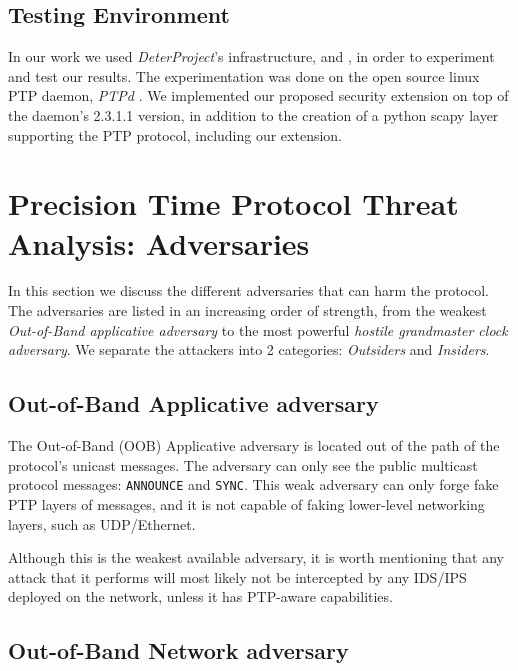 \documentclass[11pt]{article}
\begin{document}
\subsection{Testing Environment}\label{environment}

In our work we used \emph{DeterProject}'s infrastructure, \cite{Deter} and \cite{DeterProject}, in order to experiment and test our results. The experimentation was done on the open source linux PTP daemon, \emph{PTPd} \cite{PTPd}. We implemented our proposed security extension on top of the daemon's 2.3.1.1 version, in addition to the creation of a python scapy layer supporting the PTP protocol, including our extension.





\section{Precision Time Protocol Threat Analysis: Adversaries}\label{Threat Analysis}



In this section we discuss the different adversaries that can harm the protocol. The adversaries are listed in an increasing order of strength, from the weakest \emph{Out-of-Band applicative adversary} to the most powerful \emph{hostile grandmaster clock adversary}. We separate the attackers into 2 categories: \emph{Outsiders} and \emph{Insiders}.



\subsection{Out-of-Band Applicative adversary}\label{adv:OOB}

The Out-of-Band (OOB) Applicative adversary is located out of the path of the protocol's unicast messages. The adversary can only see the public multicast protocol messages: \texttt{ANNOUNCE} and \texttt{SYNC}. This weak adversary can only forge fake PTP layers of messages, and it is not capable of faking lower-level networking layers, such as UDP/Ethernet.

Although this is the weakest available adversary, it is worth mentioning that any attack that it performs will most likely not be intercepted by any IDS/IPS deployed on the network, unless it has PTP-aware capabilities.



\subsection{Out-of-Band Network adversary}\label{adv:OOB-net}
\end{document}
